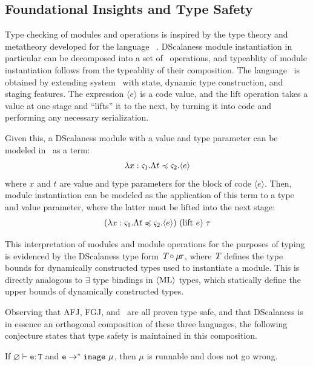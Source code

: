 \subsection{Foundational Insights and Type Safety} 
\label{section-framedml}


Type checking of modules and operations is inspired by the type theory and metatheory developed
for the language \fml\ \cite{FramedML}. DScalaness module instantiation in particular can be
decomposed into a set of \fml\ operations, and typeablity of module instantiation follows from
the typeablity of their composition. The language \fml\ is obtained by extending system \fsub\
with state, dynamic type construction, and staging features. The expression $\langle e \rangle$
is a code value, and the $\mathrm{lift}$ operation takes a value at one stage and ``lifts'' it
to the next, by turning it into code and performing any necessary serialization.

Given this, a DScalaness module with a value and type parameter can be
modeled in \fml\ as a term: 
$$\lambda x : \varsigma_1 . \Lambda t \preccurlyeq \varsigma_2 . \langle e \rangle$$
where $x$ and $t$ are value and type parameters for the block of code $\langle e \rangle$. Then,
module instantiation can be modeled as the application of this term to a type and value
parameter, where the latter must be lifted into the next stage:
$$
(\lambda x : \s_1 . \Lambda t \subtype \s_2 . \langle e \rangle)\ (\mathrm{lift}\ e)\ \t
$$ 

This interpretation of modules and module operations for the purposes of typing is evidenced by
the DScalaness type form $\textit{T} \circ \mu\!\tau$, where $\textit{T}$ defines the type bounds
for dynamically constructed types used to instantiate a module. This is directly analogous to
$\exists$ type bindings in $\langle \text{ML} \rangle$ types, which statically define the upper bounds of dynamically
constructed types.

Observing that AFJ, FGJ, and \fml\ are all proven type safe, and that DScalaness is in essence
an orthogonal composition of these three languages, the following conjecture states that type
safety is maintained in this composition.

\begin{conject}
  If $\varnothing \vdash \texttt{e} : \texttt{T}$ and $\texttt{e} \rightarrow^* \mathtt{image}\ \mu$,
  then $\mu$ is runnable and does not go wrong.
\end{conject}

